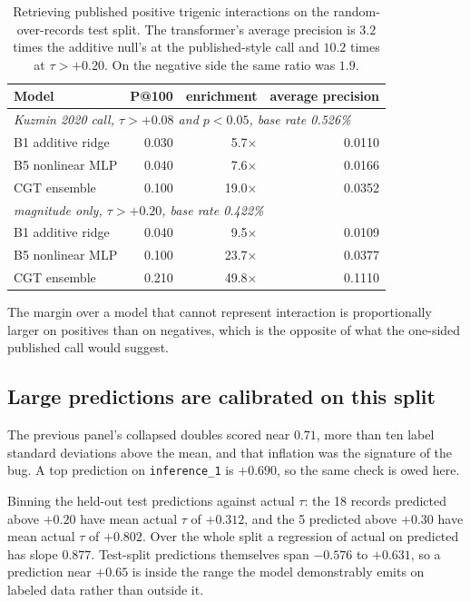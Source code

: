 \begin{table}[H]
\centering
\begin{tabular}{lrrr}
\toprule
Model & P@100 & enrichment & average precision \\
\midrule
\multicolumn{4}{l}{\emph{Kuzmin 2020 call, $\tau > +0.08$ and $p < 0.05$, base rate 0.526\%}} \\
B1 additive ridge & 0.030 & 5.7$\times$  & 0.0110 \\
B5 nonlinear MLP  & 0.040 & 7.6$\times$  & 0.0166 \\
CGT ensemble      & 0.100 & 19.0$\times$ & 0.0352 \\
\midrule
\multicolumn{4}{l}{\emph{magnitude only, $\tau > +0.20$, base rate 0.422\%}} \\
B1 additive ridge & 0.040 & 9.5$\times$  & 0.0109 \\
B5 nonlinear MLP  & 0.100 & 23.7$\times$ & 0.0377 \\
CGT ensemble      & 0.210 & 49.8$\times$ & 0.1110 \\
\bottomrule
\end{tabular}
\caption{Retrieving published positive trigenic interactions on the
random-over-records test split. The transformer's average precision is
$3.2$ times the additive null's at the published-style call and $10.2$ times at
$\tau > +0.20$. On the negative side the same ratio was $1.9$.}
\end{table}

The margin over a model that cannot represent interaction is proportionally
larger on positives than on negatives, which is the opposite of what the
one-sided published call would suggest.

\subsection{Large predictions are calibrated on this split}

The previous panel's collapsed doubles scored near $0.71$, more than ten label
standard deviations above the mean, and that inflation was the signature of the
bug. A top prediction on \texttt{inference\_1} is $+0.690$, so the same check is
owed here.

Binning the held-out test predictions against actual $\tau$: the 18 records
predicted above $+0.20$ have mean actual $\tau$ of $+0.312$, and the 5 predicted
above $+0.30$ have mean actual $\tau$ of $+0.802$. Over the whole split a
regression of actual on predicted has slope $0.877$. Test-split predictions
themselves span $-0.576$ to $+0.631$, so a prediction near $+0.65$ is inside the
range the model demonstrably emits on labeled data rather than outside it.

